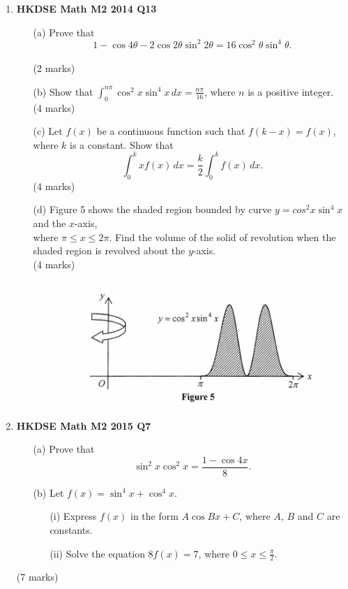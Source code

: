 \documentclass{report}
\begin{document}
\begin{enumerate}
	\item \textbf{HKDSE Math M2 2014 Q13}
	\begin{enumerate}
		\item [(a)]Prove that $$1 - \cos{4\theta} - 2\cos{2\theta}\sin^2{2\theta} = 16\cos^2{\theta}\sin^4{\theta}.$$ \\(2 marks)
		\item [(b)]Show that $\displaystyle\int_{0}^{n\pi} \cos^2{x}\sin^4{x} \,dx = \displaystyle\frac{n\pi}{16}$, where $n$ is a positive integer.\\(4 marks)
		\item [(c)]Let $f(x)$ be a continuous function such that $f(k-x) = f(x)$, where $k$ is a constant. Show that $$\displaystyle\int_{0}^k xf(x)\, dx = \frac{k}{2} \int_{0}^k f(x) \,dx.$$
		(4 marks)
		\item [(d)]Figure 5 shows the shaded region bounded by curve $y = cos^2{x} \sin^4{x}$ and the $x$-axis, \\
		where $\pi \leq x \leq 2\pi$. Find the volume of the solid of revolution when the shaded region is revolved about the $y$-axis.\\
		(4 marks)
			\begin{figure}[H]
				\centering
				\includegraphics[width = .5\linewidth]{2014Figure5}
			\end{figure}
	\end{enumerate}

	\item \textbf{HKDSE Math M2 2015 Q7}
	\begin{enumerate}
		\item [(a)]Prove that $$\sin^2{x}\cos^2{x} = \displaystyle\frac{1 - \cos{4x}}{8}.$$ 
		\item [(b)]Let $f(x) = \sin^4{x} + \cos^4{x}$. 
		\begin{enumerate}
			\item [(i)]Express $f(x)$ in the form $A\cos{Bx} + C$, where $A$, $B$ and $C$ are constants.
			\item [(ii)]Solve the equation $8f(x) = 7$, where $ 0\leq  x \leq \displaystyle\frac{\pi}{2}$.
		\end{enumerate}
	\end{enumerate}
	(7 marks)


\end{enumerate}
\end{document}
